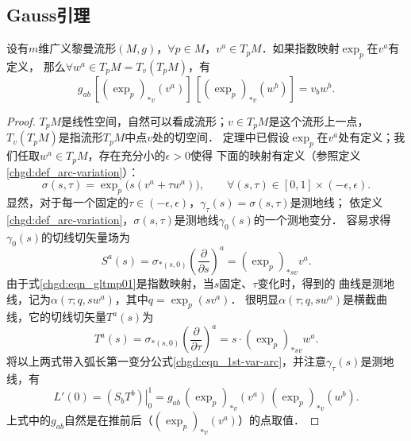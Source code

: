 \subsection{Gauss引理}
\begin{theorem}\label{chgd:thm_Gauss-lemma}
    设有$m$维广义黎曼流形$(M,g)$，$\forall p\in M$，$v^a\in T_p M$．如果指数映射$\exp_p$在$v^a$有定义，
    那么$\forall w^a\in T_p M = T_v(T_p M)$，有
    \begin{equation}\label{chgd:eqn_Gauss-lemma}
        g_{ab} \, \left[(\exp_{p})_{*v}(v^a)\right] \,
        \left[(\exp_{p})_{*v}(w^b)\right] = v_b w^b .
    \end{equation}
\end{theorem}
\begin{proof}
    $T_pM$是线性空间，自然可以看成流形；$v\in T_pM$是这个流形上一点，$T_v(T_p M)$是指流形$T_pM$中点$v$处的切空间．
    定理中已假设$\exp_{p}$在$v^a$处有定义；我们任取$w^a \in T_pM$，存在充分小的$\epsilon >0$使得
    下面的映射有定义（参照定义\ref{chgd:def_arc-variation}）：
    \begin{equation}\label{chgd:eqn_gltmp01}
        \sigma(s,\tau)=\exp_{p}\bigl(s (v^a+\tau w^a)\bigr),
        \qquad \forall (s,\tau)\in [0,1]\times (-\epsilon,\epsilon) .
    \end{equation}
    显然，对于每一个固定的$\tau\in  (-\epsilon,\epsilon)$，$\gamma_\tau(s)=\sigma(s,\tau)$是测地线；
    依定义\ref{chgd:def_arc-variation}，$\sigma(s,\tau)$是测地线$\gamma_0(s)$的一个测地变分．
    容易求得$\gamma_0(s)$的切线切矢量场为
    \begin{equation}
        S^a(s) = \sigma_{*(s,0)}\left(\frac{\partial}{\partial s}\right)^a
        = (\exp_{p})_{*s v} v^a .
    \end{equation}
    由于式\eqref{chgd:eqn_gltmp01}是指数映射，当$s$固定、$\tau$变化时，得到的
    曲线是测地线，记为$\alpha(\tau;q,s w^a)$，其中$q=\exp_p(s v^a)$．
    很明显$\alpha(\tau;q,s w^a)$是横截曲线，它的切线切矢量$T^a(s)$为
    \begin{equation}
        T^a(s) = \sigma_{*(s,0)}\left(\frac{\partial}{\partial \tau}\right)^a = s\cdot (\exp_{p})_{*s v} w^a .
    \end{equation}
    将以上两式带入弧长第一变分公式\eqref{chgd:eqn_1st-var-arc}，并注意$\gamma_{\tau}(s)$是测地线，有
    \begin{equation}\label{chgd:eqn_gltmp03}
        L'(0)= \left.\left({S}_b  {T}^b\right)\right|_{0}^{1}
        =g_{ab} \, (\exp_{p})_{*v}(v^a) \, (\exp_{p})_{*v}(w^b) .
    \end{equation}
    上式中的$g_{ab}$自然是在推前后（$(\exp_{p})_{*v}(v^a)$）的点取值．


\end{proof}
